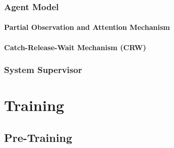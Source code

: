 \documentclass{article}
\begin{document}
	        \subsubsection{Agent Model}

                \paragraph{Partial Observation and Attention Mechanism}


                \paragraph{Catch-Release-Wait Mechanism (CRW)}

            \subsubsection{System Supervisor}

	\section{Training}

        \subsection{Pre-Training}
\end{document}
